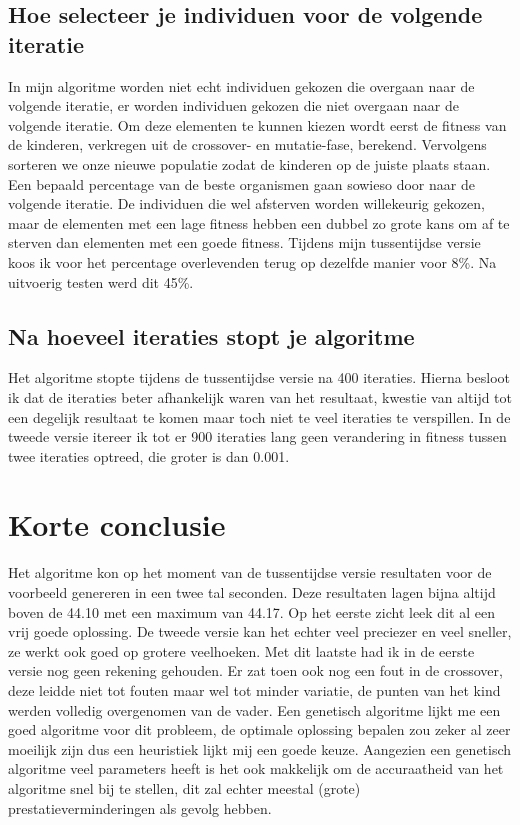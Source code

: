 \documentclass[a4paper]{article}
\begin{document}
\subsection{Hoe selecteer je individuen voor de volgende iteratie}
In mijn algoritme worden niet echt individuen gekozen die overgaan naar de volgende iteratie, er worden individuen gekozen die niet overgaan naar de volgende iteratie. Om deze elementen te kunnen kiezen wordt eerst de fitness van de kinderen, verkregen uit de crossover- en mutatie-fase, berekend. Vervolgens sorteren we onze nieuwe populatie zodat de kinderen op de juiste plaats staan. Een bepaald percentage van de beste organismen gaan sowieso door naar de volgende iteratie. De individuen die wel afsterven worden willekeurig gekozen, maar de elementen met een lage fitness hebben een dubbel zo grote kans om af te sterven dan elementen met een goede fitness. Tijdens mijn tussentijdse versie koos ik voor het percentage overlevenden terug op dezelfde manier voor 8\%. Na uitvoerig testen werd dit 45\%.
\subsection{Na hoeveel iteraties stopt je algoritme}
Het algoritme stopte tijdens de tussentijdse versie na 400 iteraties. Hierna besloot ik dat de iteraties beter afhankelijk waren van het resultaat, kwestie van altijd tot een degelijk resultaat te komen maar toch niet te veel iteraties te verspillen. In de tweede versie itereer ik tot er 900 iteraties lang geen verandering in fitness tussen twee iteraties optreed, die groter is dan 0.001.
\section{Korte conclusie}
Het algoritme kon op het moment van de tussentijdse versie resultaten voor de voorbeeld genereren in een twee tal seconden. Deze resultaten lagen bijna altijd boven de 44.10 met een maximum van 44.17. Op het eerste zicht leek dit al een vrij goede oplossing. De tweede versie kan het echter veel preciezer en veel sneller, ze werkt ook goed op grotere veelhoeken. Met dit laatste had ik in de eerste versie nog geen rekening gehouden. Er zat toen ook nog een fout in de crossover, deze leidde niet tot fouten maar wel tot minder variatie, de punten van het kind werden volledig overgenomen van de vader. Een genetisch algoritme lijkt me een goed algoritme voor dit probleem, de optimale oplossing bepalen zou zeker al zeer moeilijk zijn dus een heuristiek lijkt mij een goede keuze. Aangezien een genetisch algoritme veel parameters heeft is het ook makkelijk om de accuraatheid van het algoritme snel bij te stellen, dit zal echter meestal (grote) prestatieverminderingen als gevolg hebben.
\end{document}
